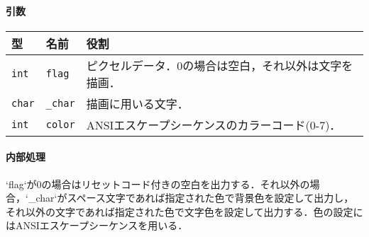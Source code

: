 \documentclass[uplatex]{jsarticle}
\begin{document}
\paragraph{引数}
\begin{center}
    \begin{tabular}{|l|l|p{7cm}|}
        \hline
        \textbf{型} & \textbf{名前} & \textbf{役割} \\ \hline
        \texttt{int} & \texttt{flag} & ピクセルデータ．0の場合は空白，それ以外は文字を描画． \\ \hline
        \texttt{char} & \texttt{\_char} & 描画に用いる文字． \\ \hline
        \texttt{int} & \texttt{color} & ANSIエスケープシーケンスのカラーコード(0-7)． \\ \hline
    \end{tabular}
\end{center}

\paragraph{内部処理}
`flag`が0の場合はリセットコード付きの空白を出力する．それ以外の場合，`\_char`がスペース文字であれば指定された色で背景色を設定して出力し，それ以外の文字であれば指定された色で文字色を設定して出力する．色の設定にはANSIエスケープシーケンスを用いる．
\end{document}

